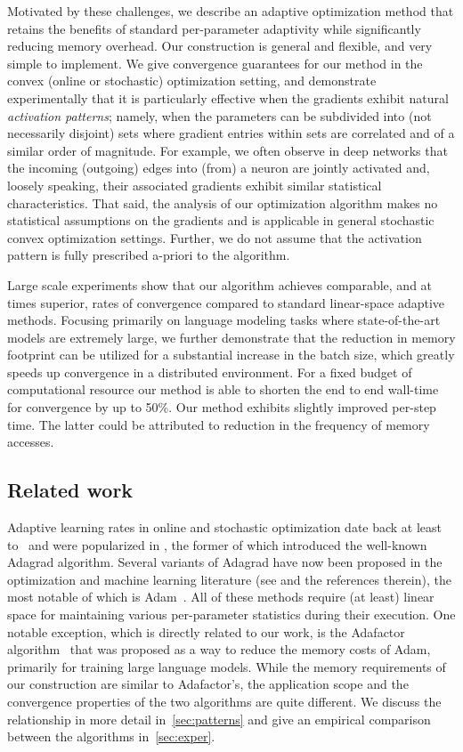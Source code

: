 \documentclass[a4paper,11pt]{article}
\begin{document}
Motivated by these challenges, we describe an adaptive optimization method that
retains the benefits of standard per-parameter adaptivity while significantly
reducing memory overhead. Our construction is general and flexible, and very
simple to implement. We give convergence guarantees for our method in the convex
(online or stochastic) optimization setting, and demonstrate experimentally that
it is particularly effective when the gradients exhibit natural {\em activation
patterns}; namely, when the parameters can be subdivided into (not necessarily
disjoint) sets where gradient entries within sets are correlated and of a
similar order of magnitude. For example, we often observe in deep networks that
the incoming (outgoing) edges into (from) a neuron are jointly activated and,
loosely speaking, their associated gradients exhibit similar statistical
characteristics. That said, the analysis of our optimization algorithm makes no
statistical assumptions on the gradients and is applicable in general stochastic
convex optimization settings. Further, we do not assume that the activation
pattern is fully prescribed a-priori to the algorithm.

Large scale experiments show that our algorithm achieves comparable, and at
times superior, rates of convergence compared to standard linear-space
adaptive methods. Focusing primarily on language modeling tasks where
state-of-the-art models are extremely large, we further demonstrate that the
reduction in memory footprint can be utilized for a substantial increase in
the batch size, which greatly speeds up convergence in a distributed
environment. For a fixed budget of computational resource our method is able
to shorten the end to end wall-time for convergence by up to 50\%. Our method
exhibits slightly improved per-step time. The latter could be attributed to
reduction in the frequency of memory accesses.

\subsection{Related work}

Adaptive learning rates in online and stochastic optimization date back at least
to~\cite{auer2002adaptive} and were popularized in
\cite{duchi2011adaptive,mcmahan2010adaptive}, the former of which introduced the
well-known Adagrad algorithm. Several variants of Adagrad have now been proposed
in the optimization and machine learning literature (see
\citep{reddi2018convergence} and the references therein), the most notable of
which is Adam~\cite{kingma2014adam}. All of these methods require (at least)
linear space for maintaining various per-parameter statistics during their
execution.
One notable exception, which is directly related to our work, is the Adafactor
algorithm~\cite{shazeer18} that was proposed as a way to reduce the memory costs
of Adam, primarily for training large language models. While the memory
requirements of our construction are similar to Adafactor's, the application
scope and the convergence properties of the two algorithms are quite different.
We discuss the relationship in more detail in~\cref{sec:patterns} and give an
empirical comparison between the algorithms in~\cref{sec:exper}.
\end{document}
